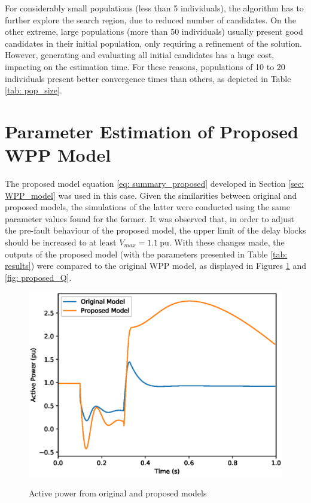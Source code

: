 For considerably small populations (less than 5 individuals), the algorithm has to further explore the search region, due to reduced number of candidates. On the other extreme, large populations (more than 50 individuals) usually present good candidates in their initial population, only requiring a refinement of the solution. However, generating and evaluating all initial candidates has a huge cost, impacting on the estimation time. For these reasons, populations of 10 to 20 individuals present better convergence times than others, as depicted in Table \ref{tab: pop_size}.

\section{Parameter Estimation of Proposed WPP Model}

The proposed model equation \eqref{eq: summary_proposed} developed in Section \ref{sec: WPP_model} was used in this case. Given the similarities between original and proposed models, the simulations of the latter were conducted using the same parameter values found for the former. It was observed that, in order to adjust the pre-fault behaviour of the proposed model, the upper limit of the delay blocks should be increased to at least $V_{max} = 1.1\ \text{pu}$. With these changes made, the outputs of the proposed model (with the parameters presented in Table \ref{tab: results}) were compared to the original WPP model, as displayed in Figures \ref{fig: proposed_P} and \ref{fig: proposed_Q}.

\begin{figure}[!h]
	\centering
	\caption{Active power from original and proposed models}
	\includegraphics[scale=.7]{Images/P_proposed.eps}
	\label{fig: proposed_P}
\end{figure}

